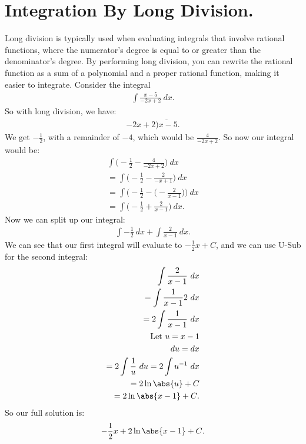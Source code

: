 \documentclass{report}
\begin{document}
      \section{\Large{Integration By Long Division.}}
      \bigbreak \noindent 
      Long division is typically used when evaluating integrals that involve rational functions, where the numerator's degree is equal to or greater than the denominator's degree. By performing long division, you can rewrite the rational function as a sum of a polynomial and a proper rational function, making it easier to integrate.
      \bigbreak \noindent 
      Consider the integral
      \begin{align*}
          \int \frac{x-5}{-2x+2}\ dx
      .\end{align*}
      \bigbreak \noindent 
      So with long division, we have:
      \begin{align*}
          -2x+2 \overline{)x-5}
      .\end{align*}
      \bigbreak \noindent \bigbreak \noindent 
      We get $-\frac{1}{2}$, with a remainder of $-4$, which would be $\frac{4}{-2x+2} $. So now our integral would be:
      \bigbreak \noindent 
      \begin{align*}
          \int \bigg(-\frac{1}{2} - \frac{4}{-2x+2}\bigg)\ dx \\
          = \int \bigg(-\frac{1}{2} - \frac{2}{-x+1}\bigg)\ dx \\
          = \int \bigg(-\frac{1}{2} - \bigg(-\frac{2}{x-1}\bigg)\bigg)\ dx \\
          = \int \bigg(-\frac{1}{2} + \frac{2}{x-1}\bigg)\ dx
      .\end{align*}
      \bigbreak \noindent 
      Now we can split up our integral:
      \begin{align*}
          \int -\frac{1}{2}\ dx + \int \frac{2}{x-1}\ dx
      .\end{align*}
      \bigbreak \noindent 
      We can see that our first integral will evaluate to $-\frac{1}{2}x + C $, and we can use U-Sub for the second integral:
      \begin{align*}
          \int \frac{2}{x-1}\ dx \\
          = \int \frac{1}{x-1}2\ dx \\
          = 2\int \frac{1}{x-1}\ dx \\
          \text{Let $u=x-1$} \\
          du = dx \\
        = 2\int \frac{1}{u}\ du = 2\int u^{-1}\ dx \\
        = 2\ln{\abs{u}} + C \\
        = 2\ln{\abs{x-1} + C}
      .\end{align*}
      \bigbreak \noindent \bigbreak \noindent 
      So our full solution is:
      \begin{align*}
          -\frac{1}{2}x + 2\ln{\abs{x-1} + C}
      .\end{align*}
\end{document}
